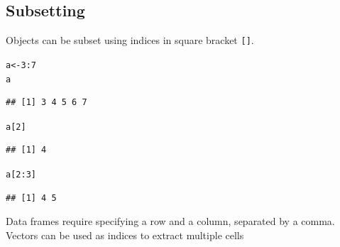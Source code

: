 \documentclass{article}\usepackage[]{graphicx}\usepackage[]{color}
\makeatletter
\newcommand{\hlnum}[1]{\textcolor[rgb]{0.686,0.059,0.569}{#1}}%
\newcommand{\hlopt}[1]{\textcolor[rgb]{0,0,0}{#1}}%
\newcommand{\hlstd}[1]{\textcolor[rgb]{0.345,0.345,0.345}{#1}}%
\newcommand{\hlkwb}[1]{\textcolor[rgb]{0.69,0.353,0.396}{#1}}%
\newenvironment{kframe}{%
 \def\at@end@of@kframe{}%
 \ifinner\ifhmode%
  \def\at@end@of@kframe{\end{minipage}}%
  \begin{minipage}{\columnwidth}%
 \fi\fi%
 \def\FrameCommand##1{\hskip\@totalleftmargin \hskip-\fboxsep
 \colorbox{shadecolor}{##1}\hskip-\fboxsep
     \hskip-\linewidth \hskip-\@totalleftmargin \hskip\columnwidth}%
 \MakeFramed {\advance\hsize-\width
   \@totalleftmargin\z@ \linewidth\hsize
   \@setminipage}}%
 {\par\unskip\endMakeFramed%
 \at@end@of@kframe}
\newenvironment{knitrout}{}{} %
\makeatother
\begin{document}
\subsection{Subsetting}
Objects can be subset using indices in square bracket \texttt{[]}.
\begin{knitrout}
\color{fgcolor}\begin{kframe}
\begin{alltt}
\hlstd{a} \hlkwb{<-} \hlnum{3}\hlopt{:}\hlnum{7}
\hlstd{a}
\end{alltt}
\begin{verbatim}
## [1] 3 4 5 6 7
\end{verbatim}
\begin{alltt}
\hlstd{a[}\hlnum{2}\hlstd{]}
\end{alltt}
\begin{verbatim}
## [1] 4
\end{verbatim}
\begin{alltt}
\hlstd{a[}\hlnum{2}\hlopt{:}\hlnum{3}\hlstd{]}
\end{alltt}
\begin{verbatim}
## [1] 4 5
\end{verbatim}
\end{kframe}
\end{knitrout}
Data frames require specifying a row and a column, separated by a comma. Vectors can be used as indices to extract multiple cells
\end{document}
